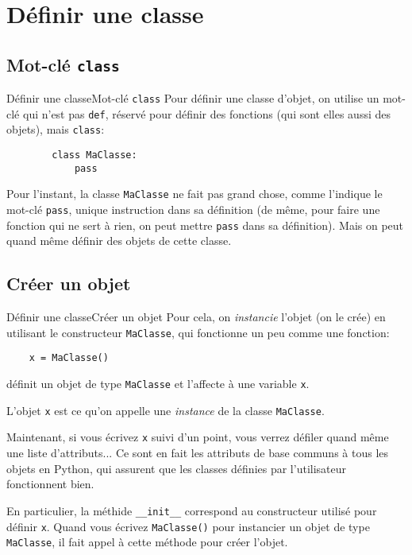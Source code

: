 \section{Définir une classe}

\subsection{Mot-clé \texttt{class}}

\begin{frame}[fragile]{Définir une classe}{Mot-clé \lstinline|class|}
	Pour définir une classe d'objet, on utilise un mot-clé qui n'est pas \lstinline|def|, réservé pour définir des fonctions (qui sont elles aussi des objets), mais \lstinline|class|:\pause
	\begin{lstlisting}
		class MaClasse:
			pass
	\end{lstlisting}\pause
	Pour l'instant, la classe \lstinline|MaClasse| ne fait pas grand chose, comme l'indique le mot-clé \lstinline|pass|, unique instruction dans sa définition (de même, pour faire une fonction qui ne sert à rien, on peut mettre \lstinline|pass| dans sa définition). Mais on peut quand même définir des objets de cette classe.
\end{frame}

\subsection{Créer un objet}

\begin{frame}[fragile]{Définir une classe}{Créer un objet}
	Pour cela, on \textit{instancie} l'objet (on le crée) en utilisant le constructeur \lstinline|MaClasse|, qui fonctionne un peu comme une fonction:
	\begin{lstlisting}
	x = MaClasse()
	\end{lstlisting}
	définit un objet de type \lstinline|MaClasse| et l'affecte à une variable \lstinline|x|.
	
	L'objet \lstinline|x| est ce qu'on appelle une \textit{instance} de la classe \lstinline|MaClasse|.

	Maintenant, si vous écrivez \lstinline|x| suivi d'un point, vous verrez défiler quand même une liste d'attributs... Ce sont en fait les attributs de base communs à tous les objets en Python, qui assurent que les classes définies par l'utilisateur fonctionnent bien.\pause

	En particulier, la méthide \lstinline|__init__| correspond au constructeur utilisé pour définir \lstinline|x|. Quand vous écrivez \lstinline|MaClasse()| pour instancier un objet de type \lstinline|MaClasse|, il fait appel à cette méthode pour créer l'objet.
\end{frame}

